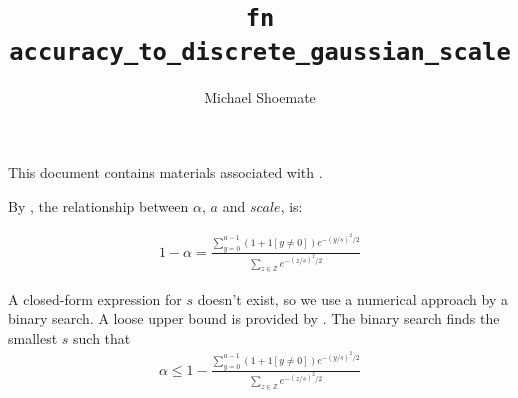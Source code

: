 \documentclass{article}
\title{\texttt{fn accuracy\_to\_discrete\_gaussian\_scale}}
\author{Michael Shoemate}
\begin{document}
\maketitle

This document contains materials associated with .

By , 
the relationship between $\alpha$, $a$ and $scale$, is:

\begin{align*}
    1 - \alpha = \frac{\sum_{y=0}^{a - 1} (1 + 1[y \ne 0]) e^{-(y/s)^2/2}}{\sum_{z \in \mathbb{Z}} e^{-(z/s)^2/2}}
\end{align*}

A closed-form expression for $s$ doesn't exist, 
so we use a numerical approach by a binary search.
A loose upper bound is provided by .
The binary search finds the smallest $s$ such that
\begin{align*}
    \alpha \le 1 - \frac{\sum_{y=0}^{a - 1} (1 + 1[y \ne 0]) e^{-(y/s)^2/2}}{\sum_{z \in \mathbb{Z}} e^{-(z/s)^2/2}}
\end{align*}
\end{document}
